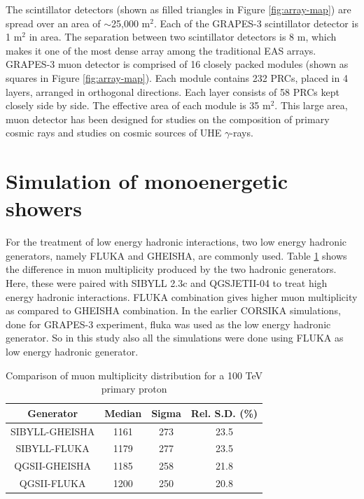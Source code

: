 \documentclass[12pt]{article}
\begin{document}
The scintillator detectors (shown as filled triangles in Figure \ref{fig:array-map}) are spread over an area of $\sim$25,000 m$^2$. Each of the GRAPES-3 scintillator detector is 1 m$^2$ in area. The separation between two scintillator detectors is 8 m, which makes it one of the most dense array among the traditional EAS arrays. GRAPES-3 muon detector is comprised of 16 closely packed modules (shown as squares in Figure \ref{fig:array-map}). Each module contains 232 PRCs, placed in 4 layers, arranged in orthogonal directions. Each layer consists of 58 PRCs kept closely side by side. The effective area of each module is 35 m$^2$. This large area, muon detector has been designed for studies on the composition of primary cosmic rays and studies on cosmic sources of UHE $\gamma$-rays. 


\section{Simulation of monoenergetic showers}

For the treatment of low energy hadronic interactions, two low energy hadronic generators, namely FLUKA and GHEISHA, are commonly used. Table \ref{tab:fluka-gheisha} shows the difference in muon multiplicity produced by the two hadronic generators. Here, these were paired with SIBYLL 2.3c and QGSJETII-04 to treat high energy hadronic interactions. FLUKA combination gives higher muon multiplicity as compared to GHEISHA combination. In the earlier CORSIKA simulations, done for GRAPES-3 experiment, fluka was used as the low energy hadronic generator. So in this study also all the simulations were done using FLUKA as low energy hadronic generator. 

\begin{table}
\centering
\begin{tabular}{ | c | c | c | c |} 
\hline
Generator & Median & Sigma & Rel. S.D. (\%) \\ 
\hline
SIBYLL-GHEISHA &1161 & 273 & 23.5  \\ 
\hline
SIBYLL-FLUKA   & 1179 & 277 & 23.5  \\
\hline
QGSII-GHEISHA  & 1185 & 258 & 21.8  \\
\hline
QGSII-FLUKA  & 1200 & 250 & 20.8 \\
\hline
\end{tabular}
\caption{Comparison of muon  multiplicity distribution for a 100 TeV primary proton}
\label{tab:fluka-gheisha}
\end{table}
\end{document}
